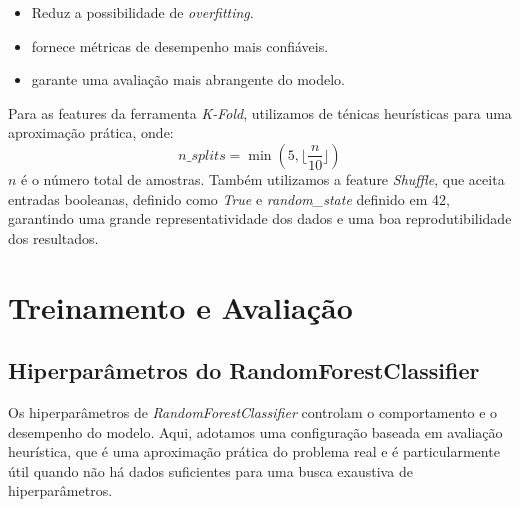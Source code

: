 \documentclass[a4paper,12pt]{article}
\begin{document}
\begin{itemize}
    \item Reduz a possibilidade de \textit{overfitting}.
    \item fornece métricas de desempenho mais confiáveis.
    \item garante uma avaliação mais abrangente do modelo.
\end{itemize}
Para as features da ferramenta \textit{K-Fold}, utilizamos de ténicas heurísticas para uma aproximação prática, onde:
\begin{equation}
    n\_splits = \min(5, \lfloor \frac{n}{10} \rfloor)
    \end{equation}
\( n \) é o número total de amostras.
\newline
\newline Também utilizamos a feature \textit{Shuffle}, que aceita entradas booleanas, definido como \textit{True} e \textit{random\_state} definido em 42, garantindo uma grande representatividade dos dados e uma boa reprodutibilidade dos resultados.

\section{Treinamento e Avaliação}

\subsection{Hiperparâmetros do RandomForestClassifier}
Os hiperparâmetros de \textit{RandomForestClassifier} controlam o comportamento e o desempenho do modelo. Aqui, adotamos uma configuração baseada em avaliação heurística, que é uma aproximação prática do problema real e é particularmente útil quando não há dados suficientes para uma busca exaustiva de hiperparâmetros.
\end{document}
